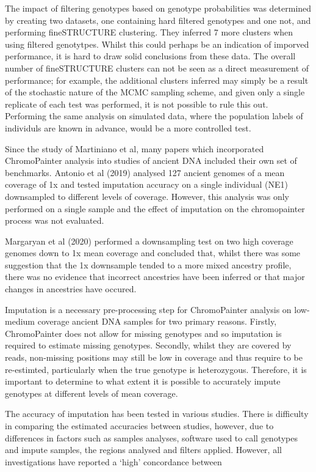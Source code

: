 The impact of filtering genotypes based on genotype probabilities was determined by creating two datasets, one containing hard filtered genotypes and one not, and performing fineSTRUCTURE clustering. They inferred 7 more clusters when using filtered genotytpes. Whilst this could perhaps be an indication of imporved performance, it is hard to draw solid conclusions from these data. The overall number of fineSTRUCTURE clusters can not be seen as a direct measurement of performance; for example, the additional clusters inferred may simply be a  result of the stochastic nature of the MCMC sampling scheme, and given only a single replicate of each test was performed, it is not possible to rule this out. Performing the same analysis on simulated data, where the population labels of individuls are known in advance, would be a more controlled test. 

Since the study of Martiniano et al, many papers which incorporated ChromoPainter analysis into studies of ancient DNA included their own set of benchmarks. Antonio et al (2019) \cite{antonio2019ancient} analysed 127 ancient genomes of a mean coverage of 1x and tested imputation accuracy on a single individual (NE1) downsampled to different levels of coverage. However, this analysis was only performed on a single sample and the effect of imputation on the chromopainter process was not evaluated. 

Margaryan et al (2020) performed a downsampling test on two high coverage genomes down to 1x mean coverage and concluded that, whilst there was some suggestion that the 1x downsample tended to a more mixed ancestry profile, there was no evidence that incorrect ancestries have been inferred or that major changes in ancestries have occured. 

Imputation is a necessary pre-processing step for ChromoPainter analysis on low-medium coverage ancient DNA samples for two primary reasons. Firstly, ChromoPainter does not allow for missing genotypes and so imputation is required to estimate missing genotypes. Secondly, whilst they are covered by reads, non-missing positions may still be low in coverage and thus require to be re-estimted, particularly when the true genotype is heterozygous. Therefore, it is important to determine to what extent it is possible to accurately impute genotypes at different levels of mean coverage. 

The accuracy of imputation has been tested in various studies. There is difficulty in comparing the estimated accuracies between studies, however, due to differences in factors such as samples analyses, software used to call genotypes and impute samples, the regions analysed and filters applied. However, all investigations have reported a `high' concordance between


